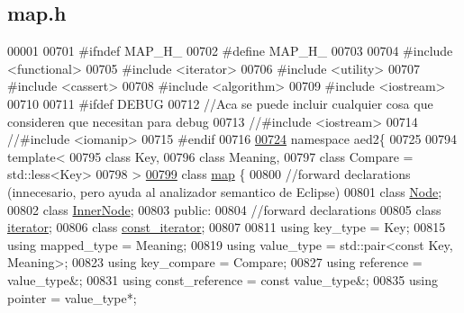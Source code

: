 \hypertarget{map_8h_source}{\subsection{map.\-h}
}

\begin{DoxyCode}
00001 
00701 \textcolor{preprocessor}{#ifndef MAP\_H\_}
00702 \textcolor{preprocessor}{}\textcolor{preprocessor}{#define MAP\_H\_}
00703 \textcolor{preprocessor}{}
00704 \textcolor{preprocessor}{#include <functional>}
00705 \textcolor{preprocessor}{#include <iterator>}
00706 \textcolor{preprocessor}{#include <utility>}
00707 \textcolor{preprocessor}{#include <cassert>}
00708 \textcolor{preprocessor}{#include <algorithm>}
00709 \textcolor{preprocessor}{#include <iostream>}
00710 
00711 \textcolor{preprocessor}{#ifdef DEBUG}
00712 \textcolor{preprocessor}{}\textcolor{comment}{//Aca se puede incluir cualquier cosa que consideren que necesitan para debug}
00713 \textcolor{comment}{//#include <iostream>}
00714 \textcolor{comment}{//#include <iomanip>}
00715 \textcolor{preprocessor}{#endif}
00716 \textcolor{preprocessor}{}
\hypertarget{map_8h_source_l00724}{}\hyperlink{namespaceaed2}{00724} \textcolor{keyword}{namespace }aed2\{
00725 
00794 \textcolor{keyword}{template}<
00795   \textcolor{keyword}{class }Key,
00796   \textcolor{keyword}{class }Meaning,
00797   \textcolor{keyword}{class }Compare = std::less<Key>
00798 >
\hypertarget{map_8h_source_l00799}{}\hyperlink{classaed2_1_1map}{00799} \textcolor{keyword}{class }\hyperlink{classaed2_1_1map}{map} \{
00800     \textcolor{comment}{//forward declarations (innecesario, pero ayuda al analizador semantico de
       Eclipse)}
00801     \textcolor{keyword}{class }\hyperlink{structaed2_1_1map_1_1Node}{Node};
00802     \textcolor{keyword}{class }\hyperlink{structaed2_1_1map_1_1InnerNode}{InnerNode};
00803 \textcolor{keyword}{public}:
00804     \textcolor{comment}{//forward declarations}
00805     \textcolor{keyword}{class }\hyperlink{classaed2_1_1map_1_1iterator}{iterator};
00806     \textcolor{keyword}{class }\hyperlink{classaed2_1_1map_1_1const__iterator}{const_iterator};
00807 
00811     \textcolor{keyword}{using} key\_type = Key;
00815     \textcolor{keyword}{using} mapped\_type = Meaning;
00819     \textcolor{keyword}{using} value\_type = std::pair<const Key, Meaning>;
00823     \textcolor{keyword}{using} key\_compare = Compare;
00827     \textcolor{keyword}{using} reference = value\_type&;
00831     \textcolor{keyword}{using} const\_reference = \textcolor{keyword}{const} value\_type&;
00835     \textcolor{keyword}{using} pointer = value\_type*;

\end{DoxyCode}
